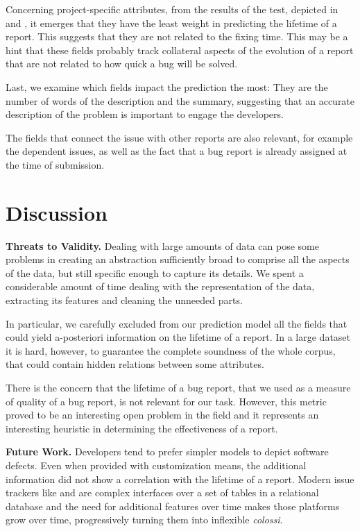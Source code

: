 Concerning project-specific attributes, from the results of the test, depicted in  and , it emerges that they have the least weight in predicting the lifetime of a report. This suggests that they are not related to the fixing time. This may be a hint that these fields probably track collateral aspects of the evolution of a report that are not related to how quick a bug will be solved.

Last, we examine which fields impact the prediction the most: They are the number of words of the description and the summary, suggesting that an accurate description of the problem is important to engage the developers. 

The fields that connect the issue with other reports are also relevant, for example the dependent issues, as well as the fact that a bug report is already assigned at the time of submission.



\section{Discussion} \label{sec:discussion}

{\bfseries Threats to Validity.} Dealing with large amounts of data can pose some problems in creating an abstraction sufficiently broad to comprise all the aspects of the data, but still specific enough to capture its details. We spent a considerable amount of time dealing with the representation of the data, extracting its features and cleaning the unneeded parts. 

In particular, we carefully excluded from our prediction model all the fields that could yield a-posteriori information on the lifetime of a report. In a large dataset it is hard, however, to guarantee the complete soundness of the whole corpus, that could contain hidden relations between some attributes.

There is the concern that the lifetime of a bug report, that we used as a measure of quality of a bug report, is not relevant for our task. However, this metric proved to be an interesting open problem in the field and it represents an interesting heuristic in determining the effectiveness of a report.

{\bfseries Future Work.} Developers tend to prefer simpler models to depict software defects. Even when provided with customization means, the additional information did not show a correlation with the lifetime of a report. Modern issue trackers like \jira and \bzilla are complex interfaces over a set of tables in a relational database and the need for additional features over time makes those platforms grow over time, progressively turning them into inflexible \emph{colossi}. 

